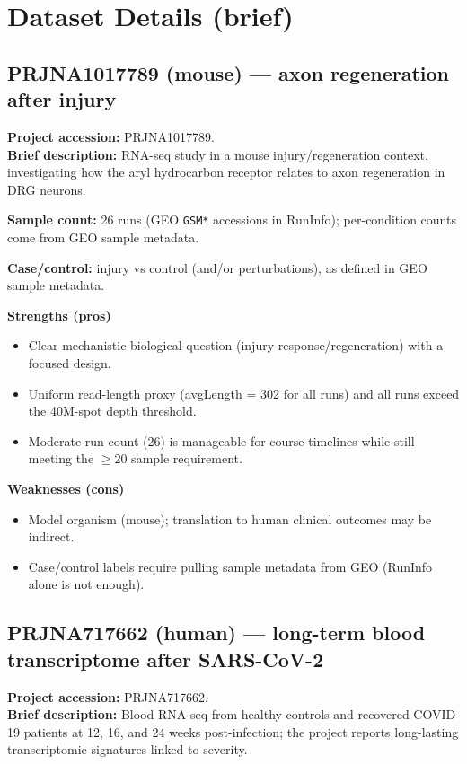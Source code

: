 \documentclass[10pt]{article}
\begin{document}
\section{Dataset Details (brief)}

\subsection*{PRJNA1017789 (mouse) --- axon regeneration after injury}
\textbf{Project accession:} PRJNA1017789.\\
\textbf{Brief description:} RNA-seq study in a mouse injury/regeneration context, investigating how the aryl hydrocarbon receptor relates to axon regeneration in DRG neurons.

\textbf{Sample count:} 26 runs (GEO \texttt{GSM*} accessions in RunInfo); per-condition counts come from GEO sample metadata.

\textbf{Case/control:} injury vs control (and/or perturbations), as defined in GEO sample metadata.

\textbf{Strengths (pros)}
\begin{itemize}[leftmargin=*]
  \item Clear mechanistic biological question (injury response/regeneration) with a focused design.
  \item Uniform read-length proxy (avgLength = 302 for all runs) and all runs exceed the 40M-spot depth threshold.
  \item Moderate run count (26) is manageable for course timelines while still meeting the \(\ge 20\) sample requirement.
\end{itemize}

\textbf{Weaknesses (cons)}
\begin{itemize}[leftmargin=*]
  \item Model organism (mouse); translation to human clinical outcomes may be indirect.
  \item Case/control labels require pulling sample metadata from GEO (RunInfo alone is not enough).
\end{itemize}

\subsection*{PRJNA717662 (human) --- long-term blood transcriptome after SARS-CoV-2}
\textbf{Project accession:} PRJNA717662.\\
\textbf{Brief description:} Blood RNA-seq from healthy controls and recovered COVID-19 patients at 12, 16, and 24 weeks post-infection; the project reports long-lasting transcriptomic signatures linked to severity.
\end{document}
